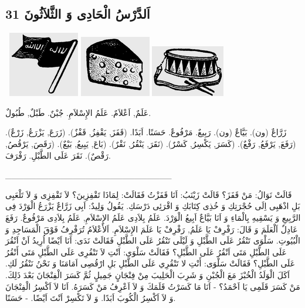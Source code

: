 \documentclass[a5paper]{article}
\begin{document}
\subsection[اَلدَّرْسُ الْحَادِى وَ الثَّلاَثُونَ 31]{اَلدَّرْسُ الْحَادِى وَ الثَّلاَثُونَ 31}
\  \includegraphics[width=1.2189in,height=1.1252in]{images/MuhammadBagauddinprettified-img063.png}   \includegraphics[width=1.2189in,height=1.052in]{images/MuhammadBagauddinprettified-img064.png}   \includegraphics[width=1.2709in,height=0.8854in]{images/MuhammadBagauddinprettified-img065.png} 

عَلَمٌ, اَعْلاَمٌ. عَلَمُ الإِسْلاَمِ. جُبْنٌ. طَبْلٌ, طُبُولٌ.

زَرَّاعٌ (ون). بَيَّاعٌ (ون). رَبِيعٌ. مَرْفُوعٌ. حَسَنًا. اَبَدًا. (قَفَزَ, يَقْفِزُ, قَفْزٌ). (زَرَعَ, يَزْرَعُ, زَرْعٌ). (رَفَعَ, يَرْفَعُ, رَفْعٌ). (كَسَرَ, يَكْسِرُ, كَسْرٌ). (نَقَرَ, يَنْقُرُ, نَقْرٌ). (بَاعَ, يَبِيعُ, بَيْعٌ). (رَقَصَ, يَرْقُصُ, رَقْصٌ). نَقَرَ عَلَى الطَّبْلِ. رَفْرَفَ.

\_\_\_\_\_\_\_\_\_\_\_\_\_\_\_\_\_\_\_\_\_\_\_\_\_\_\_

قَالَتْ نَوَالُ: مَنْ قَفَزَ؟ قَالَتْ زَيْنَبُ: اَنَا قَفَزْتُ فَقَالَتْ: لِمَاذَا تَقْفِزِينَ؟ لاَ تَقْفِزِى وَ لاَ تَلْعَبِى بَلِ اذْهَبِى اِلَى حُجْرَتِكِ وَ خُذِى كِتَابَكِ وَ اقْرَئِى دَرْسَكِ. يَقُولُ وَلِيدٌ: اَبِى زَرَّاعٌ يَزْرَعُ الْوَرْدَ فِى الرَّبِيعِ وَ يَسْقِيهِ بِالْمَاءِ وَ اَنَا بَيَّاعٌ اَبِيعُ الْوَرْدَ. عَلَمُ بِلاَدِى عَلَمُ الإِسْلاَمِ, عَلَمُ بِلاَدِى مَرْفُوعٌ. رَفَعَ عَادِلٌ اَلْعَلَمَ وَ قَالَ: رَفْرِفْ يَا عَلَمُ, رَفْرِفْ يَا عَلَمَ الإِسْلاَمِ. اَلأَعْلاَمُ تُرَفْرِفُ فَوْقَ الْمَسَاجِدِ وَ الْبُيُوتِ. سَلْوَى تَنْقُرُ عَلَى الطَّبْلِ وَ لَيْلَى تَنْقُرُ عَلَى الطَّبْلِ فَقَالَتْ نَدَى: اَنَا اَيْضًا اُرِيدُ اَنْ اَنْقُرَ عَلَى الطَّبْلِ مَتَى اَنْقُرُ عَلَى الطَّبْلِ؟ فَقَالَتْ سَلْوَى: اَنْتِ لاَ تَنْقُرِى عَلَى الطَّبْلِ مَتَى أَنْقُرُ عَلَى الطَّبْلِ؟ فَقَالَتْ سَلْوَى: أَنْتِ لا تَنْقُرِي عَلَى الطَّبْلِ بَلِ ارْقُصِى اَمَامَنَا وَ نَحْنُ نَنْقُرُ لَكِ. اَكَلَ الْوَلَدُ الْخُبْزَ مَعَ الْجُبْنِ وَ شَرِبَ الْحَلِيبَ مِنْ فِنْجَانٍ جَمِيلٍ ثُمَّ كَسَرَ الْفِنْجَانَ بَعْدَ ذَلِكَ. مَنْ كَسَرَ قَلَمِى يَا اَحْمَدُ؟ - اَنَا مَا كَسَرْتُ قَلَمَكَ وَ لاَ اَعْرِفُ مَنْ كَسَرَهُ. اَنَا لاَ اَكْسِرُ الْفِنْجَانَ وَ لاَ اَكْسِرُ الْكُوبَ اَبَدًا. وَ لاَ تَكْسِرْ اَنْتَ اَيْضًا. - حَسَنًا.
\end{document}
